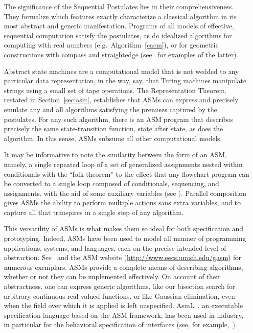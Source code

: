 \documentclass[copyright,creativecommons,english]{eptcs}
\begin{document}
The significance of the Sequential Postulates lies in their comprehensiveness.
They formalize which features exactly characterize a classical algorithm in its most
abstract and generic manifestation.
Programs of all models of effective, sequential computation satisfy the postulates, as
do idealized algorithms for computing with real numbers (e.g.\ Algorithm~\ref{cacm}), or for geometric constructions
with compass and straightedge
(see~\cite{Reisig04} for examples of the latter).

Abstract state machines are a computational model that
is not wedded to any particular data representation, in the way, say,
that Turing machines manipulate strings using a small set of tape operations.
The Representation Theorem, restated in Section~\ref{sec:asm}, establishes that ASMs can express
and precisely emulate any and all algorithms satisfying the premises captured by the postulates.
For any such algorithm, there is an ASM program that describes precisely the
same state-transition function, state after state, as does the algorithm.
In this sense, ASMs subsume all other computational models.

It may be informative to note the similarity between the form of an ASM, namely, a single repeated loop of a set of generalized assignments nested within conditionals with the ``folk theorem'' to the effect that any flowchart program can be converted to a single loop composed of conditionals, sequencing, and assignments,
with the aid of some auxiliary variables (see \cite{Harel}).
Parallel composition gives ASMs the ability to perform multiple actions sans extra variables, and to capture all that transpires in a single step of any algorithm.

This versatility of ASMs is what makes them so ideal for both specification and prototyping.
Indeed, ASMs have been used to model all manner of programming applications, systems,
and languages, each on the precise intended level of abstraction. See~\cite{Boerger02a} 
and the ASM website (\url{http://www.eecs.umich.edu/gasm}) for numerous exemplars. 
ASMs provide a complete means of describing algorithms, whether or not they can be implemented effectively.
On account of their abstractness, one can express generic algorithms, like our bisection search for arbitrary continuous real-valued functions, or like
Gaussian elimination, even when the field over which it is applied
is left unspecified.
AsmL~\cite{AsmL}, an executable specification
language based on the ASM framework, has been used in industry, in particular
for the behavioral specification of interfaces (see, for example,~\cite{BarSch01b}).
\end{document}
